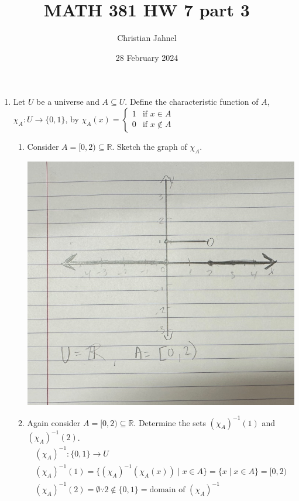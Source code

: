 \documentclass[letterpaper, 12pt]{article}
\title{MATH 381 HW 7 part 3}
\author{Christian Jahnel}
\date{28 February 2024}
\newcommand{\R}{\mathbb{R}}
\newcommand{\0}{\emptyset}
\begin{document}
\maketitle
\begin{enumerate}
\item Let $U$ be a universe and $A \subseteq U$. Define the characteristic function of $A$, 
$\chi_A : U \to \{0, 1\}$, by $\chi_A(x) = \begin{cases}
    1 & \text{if $x \in A$} \\
    0 & \text{if $x \notin A$}
\end{cases}$
\begin{enumerate}
\item Consider $A = [0, 2) \subseteq \R$. Sketch the graph of $\chi_A$.
\begin{center}
\includegraphics[scale=0.3]{graph.jpeg}
\end{center}
\item Again consider $A = [0, 2) \subseteq \R$. Determine the sets $(\chi_A)^{-1}(1)$ and 
$(\chi_A)^{-1}(2)$.
\begin{gather*}
    (\chi_A)^{-1}: \{0, 1\} \to U \\
    (\chi_A)^{-1}(1) = \{(\chi_A)^{-1}(\chi_A(x)) \mid x \in A\} = \{x \mid x \in A\} = [0, 2)\\
    (\chi_A)^{-1}(2) = \emptyset \because 2 \notin \{0, 1\} = \text{domain of } (\chi_A)^{-1}
\end{gather*}

\end{enumerate}
\end{enumerate}
\end{document}
